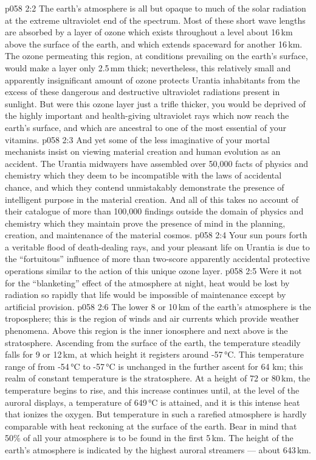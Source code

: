 \vs p058 2:2 \pc The earth’s atmosphere is all but opaque to much of the solar radiation at the extreme ultraviolet end of the spectrum. Most of these short wave lengths are absorbed by a layer of ozone which exists throughout a level about 16\,km above the surface of the earth, and which extends spaceward for another 16\,km. The ozone permeating this region, at conditions prevailing on the earth’s surface, would make a layer only 2.5\,mm thick; nevertheless, this relatively small and apparently insignificant amount of ozone protects Urantia inhabitants from the excess of these dangerous and destructive ultraviolet radiations present in sunlight. But were this ozone layer just a trifle thicker, you would be deprived of the highly important and health\hyp{}giving ultraviolet rays which now reach the earth’s surface, and which are ancestral to one of the most essential of your vitamins.
\vs p058 2:3 And yet some of the less imaginative of your mortal mechanists insist on viewing material creation and human evolution as an accident. The Urantia midwayers have assembled over 50,000 facts of physics and chemistry which they deem to be incompatible with the laws of accidental chance, and which they contend unmistakably demonstrate the presence of intelligent purpose in the material creation. And all of this takes no account of their catalogue of more than 100,000 findings outside the domain of physics and chemistry which they maintain prove the presence of mind in the planning, creation, and maintenance of the material cosmos.
\vs p058 2:4 Your sun pours forth a veritable flood of death\hyp{}dealing rays, and your pleasant life on Urantia is due to the “fortuitous” influence of more than two\hyp{}score apparently accidental protective operations similar to the action of this unique ozone layer.
\vs p058 2:5 Were it not for the “blanketing” effect of the atmosphere at night, heat would be lost by radiation so rapidly that life would be impossible of maintenance except by artificial provision.
\vs p058 2:6 \pc The lower 8 or 10\,km of the earth’s atmosphere is the troposphere; this is the region of winds and air currents which provide weather phenomena. Above this region is the inner ionosphere and next above is the stratosphere. Ascending from the surface of the earth, the temperature steadily falls for 9 or 12\,km, at which height it registers around -57\,°C. This temperature range of from -54\,°C to -57\,°C is unchanged in the further ascent for 64 km; this realm of constant temperature is the stratosphere. At a height of 72 or 80\,km, the temperature begins to rise, and this increase continues until, at the level of the auroral displays, a temperature of 649\,°C is attained, and it is this intense heat that ionizes the oxygen. But temperature in such a rarefied atmosphere is hardly comparable with heat reckoning at the surface of the earth. Bear in mind that 50\% of all your atmosphere is to be found in the first 5\,km. The height of the earth’s atmosphere is indicated by the highest auroral streamers --- about 643\,km.
